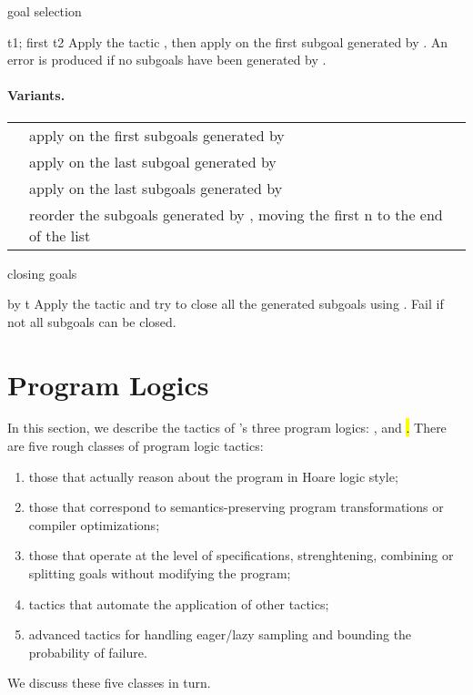\begin{tactic}[t1; first t2]{goal selection}
  \begin{tsyntax}[empty]{t1; first t2}
  Apply the tactic , then apply  on the first subgoal
  generated by . An error is produced if no subgoals have been
  generated by .

  \paragraph{Variants.}\strut

  \noindent\begin{tabularx}{\textwidth}{@{}ll@{}}
  {\ec{t1; first n t2}} & apply {\ec{t2}} on the first {\ec{n}} subgoals
    generated by {\ec{t1}}\\
  {\ec{t1; last t2}} & apply {\ec{t2}} on the last subgoal
    generated by {\ec{t1}}\\
  {\ec{t1; last n t2}} & apply {\ec{t2}} on the last {\ec{n}} subgoals
    generated by {\ec{t1}}\\
  {\ec{t; first n last}} & \parbox{200pt}{reorder the subgoals generated by {}, moving
    the first n to the end of the list}
  \end{tabularx}
  \end{tsyntax}
\end{tactic}

\begin{tactic}[by t]{closing goals}
  \begin{tsyntax}[empty]{by t}
  Apply the tactic  and try to close all the generated subgoals using
  . Fail if not all subgoals can be closed.
  \end{tsyntax}
\end{tactic}

\section{Program Logics}
\label{ProgramLogics}

In this section, we describe the tactics of \EasyCrypt's three program
logics: \prhl, \phl and \hl.  There are five rough classes of program
logic tactics:
\begin{enumerate}
\item those that actually reason about the program in Hoare logic
  style;

\item those that correspond to semantics-preserving program
  transformations or compiler optimizations;

\item those that operate at the level of specifications,
  strenghtening, combining or splitting goals without modifying the
  program;

\item tactics that automate the application of other tactics;

\item advanced tactics for handling eager/lazy sampling and bounding
  the probability of failure.
\end{enumerate}
We discuss these five classes in turn.

